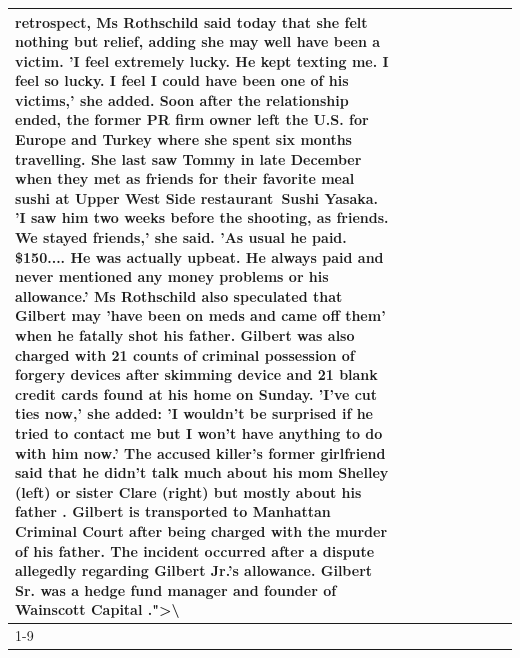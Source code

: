 \begin{table}[H]
\begin{tabular}{lllrlllll}
retrospect, Ms Rothschild said today that she felt nothing but relief, adding she may well have been a victim. 'I feel extremely lucky. He kept texting me. I feel so lucky. I feel I could have been one of his victims,' she added. Soon after the relationship ended, the former PR firm owner left the U.S. for Europe and Turkey where she spent six months  travelling. She last saw Tommy in late December when they met as friends for their favorite meal sushi at Upper West Side restaurant Sushi Yasaka. 'I saw him two weeks before the shooting, as friends. We stayed friends,' she said. 'As usual he paid. \$150.... He was actually upbeat. He always paid and never mentioned any money problems or his allowance.' Ms Rothschild also speculated that Gilbert may 'have been on meds and came off them' when he fatally shot his father. Gilbert was also charged with 21 counts of criminal possession of forgery devices after skimming device and 21 blank credit cards found at his home on Sunday. 'I've cut ties now,' she added: 'I wouldn’t be surprised if he tried to contact me but I won’t have anything to do with him now.' The accused killer's former girlfriend said that he didn't talk much about his mom Shelley (left) or sister Clare (right) but mostly about his father . Gilbert is transported to Manhattan Criminal Court  after being charged with the murder of his father. The incident occurred after a dispute allegedly regarding Gilbert Jr.'s allowance. Gilbert Sr. was a hedge fund manager and founder of Wainscott Capital .">\textbackslash  \\
\cline{1-9}

\end{tabular}
\end{table}
